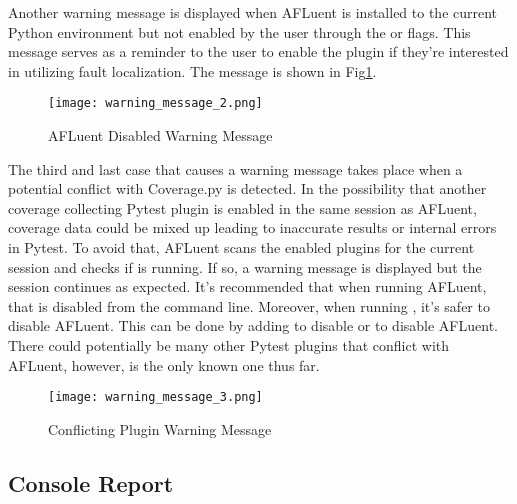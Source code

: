 Another warning message is displayed when AFLuent is installed to the current
Python environment but not enabled by the user through the  or
 flags. This message serves as a reminder to the user to
enable the plugin if they're interested in utilizing fault localization. The
message is shown in Fig\ref{fig:warning_message_2}.

\begin{figure}[!htb]
	\begin{center}
		\texttt{[image: warning\_message\_2.png]}
		\caption{\label{fig:warning_message_2} AFLuent Disabled Warning Message}
	\end{center}
\end{figure}

The third and last case that causes a warning message takes place when a potential
conflict with Coverage.py is detected. In the possibility that another coverage
collecting Pytest plugin is enabled in the same session as AFLuent, coverage
data could be mixed up leading to inaccurate results or internal errors in
Pytest. To avoid that, AFLuent scans the enabled plugins for the current session
and checks if  is running. If so, a warning message is
displayed but the session continues as expected. It's recommended that when running
AFLuent, that  is disabled from the command line. Moreover, when
running , it's safer to disable AFLuent. This can be done by
adding  to disable  or  to disable AFLuent. There could potentially be many
other Pytest plugins that conflict with AFLuent, however,  is
the only known one thus far.

\begin{figure}[!htb]
	\begin{center}
		\texttt{[image: warning\_message\_3.png]}
		\caption{\label{fig:warning_message_3} Conflicting Plugin Warning Message}
	\end{center}
\end{figure}

\subsection{Console Report}
\label{subsec:console_output}

